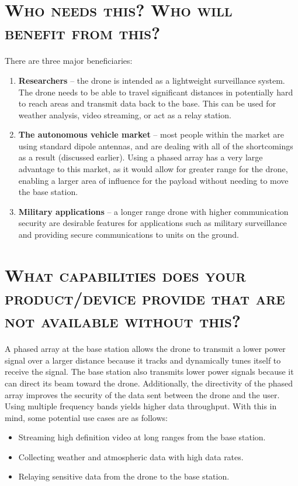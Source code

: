 \documentclass[11pt]{article}
\numberwithin{figure}{section}
\begin{document}
\section{\textsc{Who needs this? Who will benefit from this?}}
There are three major beneficiaries: 
	\begin{enumerate}
		\item \textbf{Researchers} -- the drone is intended as a lightweight surveillance system. The drone needs to be able to travel significant distances in potentially hard to reach areas and transmit data back to the base. This can be used for weather analysis, video streaming, or act as a relay station.
		\item \textbf{The autonomous vehicle market} -- most people within the market are using standard dipole antennas, and are dealing with all of the shortcomings as a result (discussed earlier). Using a phased array has a very large advantage to this market, as it would allow for greater range for the drone, enabling a larger area of influence for the payload without needing to move the base station. 
		\item \textbf{Military applications} -- a longer range drone with higher communication security are desirable features for applications such as military surveillance and providing secure communications to units on the ground.
	\end{enumerate}

\section{\textsc{What capabilities does your product/device provide that are not available without this?}}
A phased array at the base station allows the drone to transmit a lower power signal over a larger distance because it tracks and dynamically tunes itself to receive the signal. The base station also transmits lower power signals because it can direct its beam toward the drone. Additionally, the directivity of the phased array improves the security of the data sent between the drone and the user.  Using multiple frequency bands yields higher data throughput.  With this in mind, some potential use cases are as follows:
	\begin{itemize}
		\item Streaming high definition video at long ranges from the base station.
		\item Collecting weather and atmospheric data with high data rates.
		\item Relaying sensitive data from the drone to the base station.
	\end{itemize}
\end{document}
